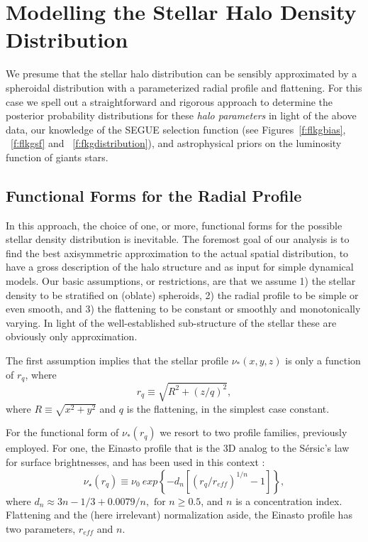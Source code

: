 \documentclass[12pt,preprint]{aastex}
\begin{document}
\section{Modelling the Stellar Halo Density Distribution}\label{sec:Modelling}

We presume that the stellar halo distribution can be sensibly approximated by a spheroidal distribution with a parameterized radial profile and flattening. For this case we spell out a straightforward and rigorous approach to determine the posterior probability distributions for these \textit{halo parameters} in light of the above data, our knowledge of the SEGUE selection function (see Figures~\ref{f:flkgbias}, ~\ref{f:flkgsf} and ~\ref{f:fkgdistribution}), and astrophysical priors on the luminosity function of giants stars. 

\subsection{Functional Forms for the Radial Profile}\label{sec:RadialProfileFunctions}

In this approach, the choice of one, or more, functional forms for the possible stellar density distribution is inevitable. The foremost goal of our analysis is to find the best axisymmetric approximation to the actual spatial distribution, to have a gross description of the halo structure and as input for simple dynamical models. Our basic assumptions, or restrictions, are that we assume 1) the stellar density to be stratified on (oblate) spheroids, 2) the radial profile to be simple or even smooth, and 3) the flattening to be constant or smoothly and monotonically varying. In light of the well-established sub-structure of the stellar these are obviously only approximation. 

The first assumption implies that the stellar profile $\nu_*(x,y,z)$ is only a function of $r_q$,
where 
\begin{equation}
r_q\equiv \sqrt{R^2 + (z/q)^2},
\end{equation}
where $R\equiv \sqrt{x^2+y^2}$ and $q$ is the flattening, in the simplest case constant.

For the functional form of $\nu_*(r_q)$ we resort to two profile families, previously employed.
For one, the Einasto profile \citep{Einasto1989} that is the 3D analog to the S{\'e}rsic's law\citep{Sersic1963} for surface brightnesses, and has been used in this context \citep{Sesar2011,Deason2011,Merritt2006} :
\begin{equation}
\nu_{\star}(r_q) \equiv \nu_0~exp\left\{-d_n\left[\left(r_q/r_{eff}\right )^{1/n}-1\right ]\right\},
\end{equation}
where $ d_n \approx 3n-1/3+0.0079/n, \mbox{ for } n \ge 0.5 \nonumber$,
and $n$ is a concentration index. Flattening and the (here irrelevant) normalization aside, the Einasto profile has two parameters, $r_{eff}$ and $n$.
\end{document}
